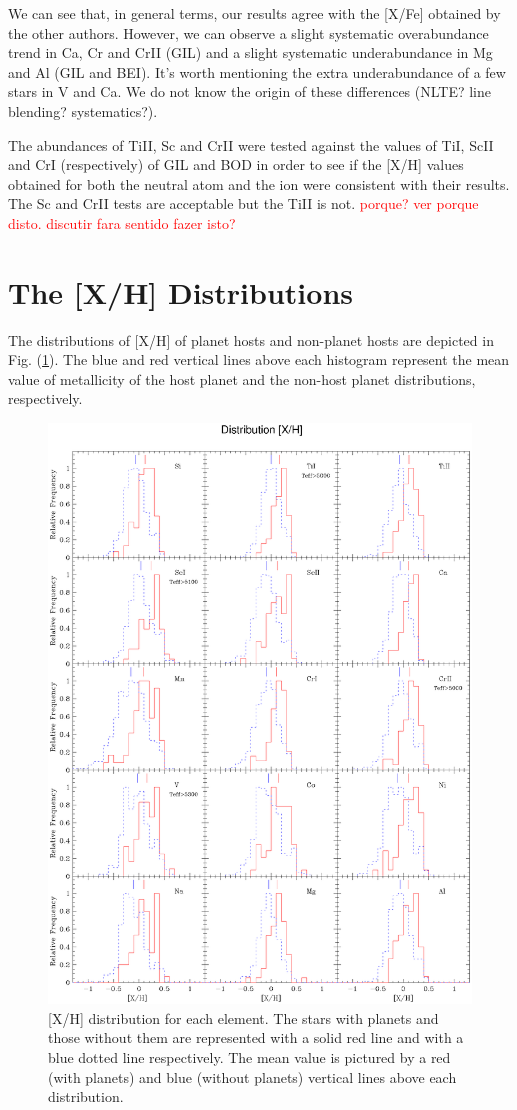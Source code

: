 \documentclass[dvips,12pt,a4paper]{report}
\begin{document}
{{We can see that, in general terms, our results agree with the [X/Fe] obtained by the other authors. However, we can observe a slight systematic overabundance trend in Ca, Cr and CrII (GIL) and a slight systematic underabundance in Mg and Al (GIL and BEI). It's worth mentioning the extra underabundance of a few stars in V and Ca. We do not know the origin of these differences (NLTE? line blending? systematics?). 

The abundances of TiII, Sc and CrII were tested against the values of TiI, ScII and CrI (respectively) of GIL and BOD in order to see if the [X/H] values obtained for both the neutral atom and the ion were consistent with their results. The Sc and CrII tests are acceptable but the TiII is not. \textcolor {red}{porque? ver porque disto. discutir fara sentido fazer isto?}




\section{The [X/H] Distributions} 

The distributions of [X/H] of planet hosts and non-planet hosts are depicted in Fig. (\ref{gfxdistro}). The blue and red vertical lines above each histogram represent the mean value of metallicity of the host planet and the non-host planet distributions, respectively.

\begin{figure}[h]
\centering
\includegraphics[width=16 cm, height=13 cm]{pics/parte4/histxhfinal.eps}
\caption[depois]{[X/H] distribution for each element. The stars with planets and those without them are represented with a solid red line and with a blue dotted line respectively. The mean value is pictured by a red (with planets) and blue (without planets) vertical lines above each distribution.}
\label{gfxdistro}
\end{figure}



}}
\end{document}
